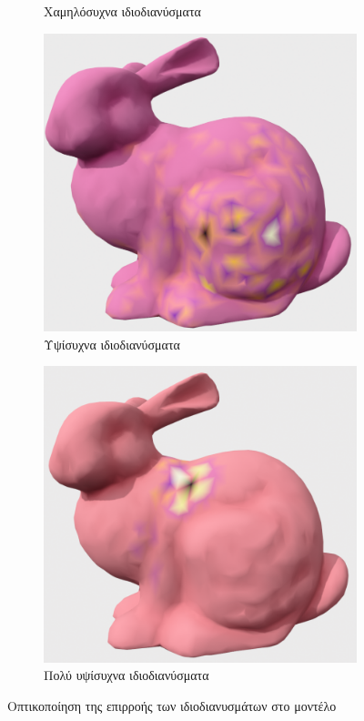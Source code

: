 \documentclass{article}
\begin{document}
\begin{figure}[h]
\begin{subfigure}{0.45\textwidth}
		\caption{Χαμηλόσυχνα ιδιοδιανύσματα}
		\label{fig:vis2}
	\end{subfigure}
	\begin{subfigure}{0.45\textwidth}
		\includegraphics[width=\textwidth]{"h_freq.png"}
		\caption{Υψίσυχνα ιδιοδιανύσματα}
		\label{fig:vis3}
	\end{subfigure}
	\begin{subfigure}{0.45\textwidth}
		\includegraphics[width=\textwidth]{"vh_freq.png"}
		\caption{Πολύ υψίσυχνα ιδιοδιανύσματα}
		\label{fig:vis4}
	\end{subfigure}
	\caption{Οπτικοποίηση της επιρροής των ιδιοδιανυσμάτων στο μοντέλο}
	\label{fig:visualization}
\end{figure}
\end{document}
